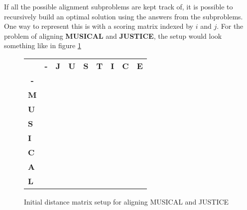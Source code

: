 If all the possible alignment subproblems are kept track of, it is possible to recursively build an optimal solution using the answers from the subproblems. One way to represent this is with a scoring matrix indexed by $i$ and $j$. For the problem of aligning \textbf{MUSICAL} and \textbf{JUSTICE}, the setup would look something like in figure \ref{alignsetup} 


\begin{figure}[!h]
\centering
\begin{tabular}{lllllllll}
                                & \multicolumn{1}{c}{\textbf{-}} & \textbf{J}            & \textbf{U}            & \textbf{S}            & \textbf{T}            & \textbf{I}            & \textbf{C}            & \textbf{E}            \\ \cline{2-9} 
\multicolumn{1}{c|}{\textbf{-}} & \multicolumn{1}{l|}{}          & \multicolumn{1}{l|}{} & \multicolumn{1}{l|}{} & \multicolumn{1}{l|}{} & \multicolumn{1}{l|}{} & \multicolumn{1}{l|}{} & \multicolumn{1}{l|}{} & \multicolumn{1}{l|}{} \\ \cline{2-9} 
\multicolumn{1}{l|}{\textbf{M}} & \multicolumn{1}{l|}{}          & \multicolumn{1}{l|}{} & \multicolumn{1}{l|}{} & \multicolumn{1}{l|}{} & \multicolumn{1}{l|}{} & \multicolumn{1}{l|}{} & \multicolumn{1}{l|}{} & \multicolumn{1}{l|}{} \\ \cline{2-9} 
\multicolumn{1}{l|}{\textbf{U}} & \multicolumn{1}{l|}{}          & \multicolumn{1}{l|}{} & \multicolumn{1}{l|}{} & \multicolumn{1}{l|}{} & \multicolumn{1}{l|}{} & \multicolumn{1}{l|}{} & \multicolumn{1}{l|}{} & \multicolumn{1}{l|}{} \\ \cline{2-9} 
\multicolumn{1}{l|}{\textbf{S}} & \multicolumn{1}{l|}{}          & \multicolumn{1}{l|}{} & \multicolumn{1}{l|}{} & \multicolumn{1}{l|}{} & \multicolumn{1}{l|}{} & \multicolumn{1}{l|}{} & \multicolumn{1}{l|}{} & \multicolumn{1}{l|}{} \\ \cline{2-9} 
\multicolumn{1}{l|}{\textbf{I}} & \multicolumn{1}{l|}{}          & \multicolumn{1}{l|}{} & \multicolumn{1}{l|}{} & \multicolumn{1}{l|}{} & \multicolumn{1}{l|}{} & \multicolumn{1}{l|}{} & \multicolumn{1}{l|}{} & \multicolumn{1}{l|}{} \\ \cline{2-9} 
\multicolumn{1}{l|}{\textbf{C}} & \multicolumn{1}{l|}{}          & \multicolumn{1}{l|}{} & \multicolumn{1}{l|}{} & \multicolumn{1}{l|}{} & \multicolumn{1}{l|}{} & \multicolumn{1}{l|}{} & \multicolumn{1}{l|}{} & \multicolumn{1}{l|}{} \\ \cline{2-9} 
\multicolumn{1}{l|}{\textbf{A}} & \multicolumn{1}{l|}{}          & \multicolumn{1}{l|}{} & \multicolumn{1}{l|}{} & \multicolumn{1}{l|}{} & \multicolumn{1}{l|}{} & \multicolumn{1}{l|}{} & \multicolumn{1}{l|}{} & \multicolumn{1}{l|}{} \\ \cline{2-9} 
\multicolumn{1}{l|}{\textbf{L}}   & \multicolumn{1}{l|}{}          & \multicolumn{1}{l|}{} & \multicolumn{1}{l|}{} & \multicolumn{1}{l|}{} & \multicolumn{1}{l|}{} & \multicolumn{1}{l|}{} & \multicolumn{1}{l|}{} & \multicolumn{1}{l|}{} \\ \cline{2-9} 
\end{tabular}
\caption{Initial distance matrix setup for aligning MUSICAL and JUSTICE}
\label{alignsetup}
\end{figure}

